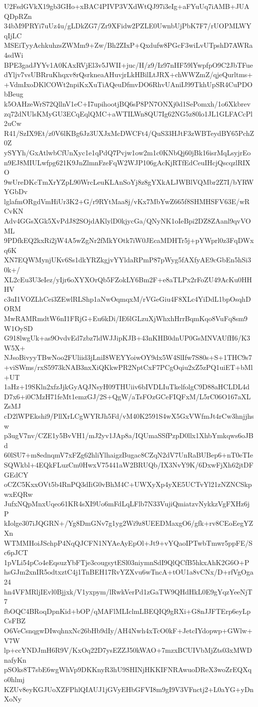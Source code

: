 U2FsdGVkX19gb3GHo+xBAC4PIVP3VXdWtQJ97i3eIg+aFYuUq7iAMB+JUAQDpRZn
34bM9PRYi7uUz4u/gLDkZG7/Zr9XFidw2PZLE0UwnbUjPbK7F7/rUOPMLWYqIjLC
MSEiTyyAchkuhzsZWMm9+Zw/Bh2ZIxP+Qxdufw8PGcF3wiLvUTpshD7AWRa4sdWi
BPE3gadJYYv1A0KAxRVjEl3v5JWII+juc/H/z9/Iz97nHF59lYwpfpO9C2JbTFue
dYljv7vsUBRruKhqxv8rQsrkneaAHuvjrLkHBilLtJRX+chWWZmZ/qjeQurltms+
+VdmIxoDKlCOWt2npiKxXuTiAQeuDfmvDO6RhvUAniIJ99TkhUpSR4CuPDObBeug
k5OAHzeWrS72QllnV1eC+I7upihootjBQ6sP8PN7ONXj0d1SePomxh/1o6Xkbrev
zq72dNUlsKMyGU3ECqEqlQMC+aWTILWn8QU7Ig62NG5z80lo1JL1GLFACcPl2uCw
R41/SzIX9Et/z0V6lKBg6Jz3UXJxMcDWCFt4/QuS33HJtF3zWBTeydBY65PchZ0Z
ySYYh/GxAtlwbCfUnXyc1e1qPdQ7Pvjw1ow2m1c0KNbQj60jBk16isrMqLsyjrEo
n9EJ8MIULwfpg621K9JnZlmnFzeFqW2WJP106gAcKjRTfEdCeuIHcjQscqzlRIXO
9wUreDKcTmXrYZpL90WrcLeuKLAnSoYj8z8gYXkALJWBlVQMbr2Z7I/bYRWYGbDv
lglafmORgdVmHiUr3K2+G/r9RYtMaa8j/vKx7MbYwZ665f8SHMHSFV63E/wRCvKN
Adv4GGsXGk5XvPdJ82SOjdAKlylD0kjycGa/QNyNK1oIeBpi2DZ8ZAanl9qvVOML
9PDfkEQ2kxRi2jW4A5wZgNr2fMkYOtk7iW0JEcaMDHTr5j+pYWprl0z3FqDWxq6K
XN7EQWMynjUKv6Ss1dkYRZkgjvYYldaRPmP87pWyg5fAXfyAE9cGbEn5hSi30k+/
XL2cEu3U3eIez/yIjr6oXYXOrQb5FZokLY6Bm2F+e8aTLPx2rFoZU49AcKu0HHHV
c3uI1VOZLhCei3ZEwlRLShp1aNwOqmqxM/rVGeGiu4F8XLc4YiDdL1bpOsqhDORM
MwRAMRmdtW6nI1FRjG+Eu6kDi/IE6lGLzuXjWhxhHrrBqmKqo8VuFq8sm9W1OySD
G918lwgUk+as9OvdvEd7zbz7ldWJJipKJB+43nKHB0dnUP0GsMNVAUfH6/K3W5X+
NJsoBivyyTBwNoo2FUliid3jLniI8WEYYoiwOY9dx5W4SlIfw7S80s+S+1THC9s7
+viSWms/rxS5973kNAB3nxXiQKkwPR2NptCxF7PCgOqiu2xZ5zPQ1uiET+bMl+UT
1aHz+19SKln2xfzJjkGyAQJNsyH09THUiiv6bIVDLIuTkelfolgC9D88aHCLDL4d
D7x6+i0CMzH71feMt1emzGJ/2S+QgW/aTsFOzGCeFIQFxM/L5rC06O167aXLZsMJ
cD2lWPEkshi9/PllXrLCgWYRJh5Fd/vM40K2591S4wX5GxVWfmJt4rCw3hnjjhsw
p3ugV7nv/CZE1y5BvVH1/mJ2yv1JAp8a/IQUmaSSfPzpD0llx1XhbYmkqws6oJBd
60lSU7+m8ednqmV7xFZg62hliYlhaigzBugac8CZqN2dV7UnRaBUBep6+nT0eTIe
SQWkbl+4EQkFLuzCm0HwxV75441aW2BRUQb/IX3NvY9K/6DxwFjXh62jtDFGEdCY
oCZC5KxxOVt5b4RnPQ3dIiG0vBhM4C+UWXyXp4yXE5UCTvYl21zNZNCSkpwxEQRw
JufxNQpMnxUqeo61KR4sXI9Uo6mFdLqLFlb7N33VujiQmiatzvNykkzVgFXHz6jP
kIolge307iJQGRN+/Yg8DmGNv7g1yg2Wi9z8UEEDMaxgO6/gfk+rv8CEoEegYZXn
WTMMHoiJSchpP4NqQJCFN1NYAeAyEpOl+Jt9+vYQaoIPTwbTmwr5ppFE/Sc6pJCT
1pVLi54pCo4eEqsuzYbFTje3cougsytESl03niymnSdI9QlQCfB5hkxAhK2G6O+P
hsGJm2xnIR5odtxztC4j1TnBEH17RvYZXvu6wTncA+tOU1a8vCNx/D+rfVgOga24
hn4VFMRljIEvl0Bjjxk/V1yxpym/lRwkVerPd1zGaTW9QHdHkL0E9gYqzYeeNjT7
fbOQC4BRoqDpnKid+bOP/qMAFlMLIclmLBEQIQ9gRXi+G8nJJFTErp6eyLpCsFBZ
O6VeCsnqgwDIwqhnxNc26bHb9dIy/AH4Nwh4xTcO0kF+JetcIYdopwp+GWlw+V7W
lp+ccYNDJmH6R9V/KxOq22D7ysEZZJ50kWAO+7mzxBCUIVbMjZts03xMWDnafyKn
pSOks8T7sbE6wgWhVp9DKKnyR3hU9SHINjHKKIFNRAwuoDReX3woZrEQXqo0hlmj
KZUv8eyKGJUoXZFPhlQIAUJ1jGVyEHbGFVI8m9gI9V3VFnctj2+L0aYG+yDnXoNy
